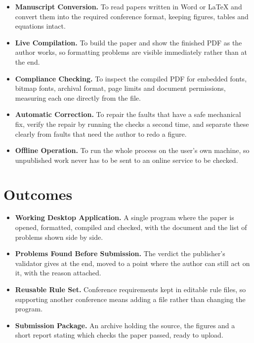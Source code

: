 \documentclass[11pt,a4paper]{article}
\newcommand{\heading}[1]{\textbf{#1}}
\begin{document}
\begin{itemize}
  \item \heading{Manuscript Conversion.} To read papers written in Word or
  \LaTeX{} and convert them into the required conference format, keeping
  figures, tables and equations intact.

  \item \heading{Live Compilation.} To build the paper and show the finished
  PDF as the author works, so formatting problems are visible immediately
  rather than at the end.

  \item \heading{Compliance Checking.} To inspect the compiled PDF for embedded
  fonts, bitmap fonts, archival format, page limits and document permissions,
  measuring each one directly from the file.

  \item \heading{Automatic Correction.} To repair the faults that have a safe
  mechanical fix, verify the repair by running the checks a second time, and
  separate these clearly from faults that need the author to redo a figure.

  \item \heading{Offline Operation.} To run the whole process on the user's own
  machine, so unpublished work never has to be sent to an online service to be
  checked.
\end{itemize}

\section{Outcomes}

\begin{itemize}
  \item \heading{Working Desktop Application.} A single program where the paper
  is opened, formatted, compiled and checked, with the document and the list of
  problems shown side by side.

  \item \heading{Problems Found Before Submission.} The verdict the publisher's
  validator gives at the end, moved to a point where the author can still act
  on it, with the reason attached.

  \item \heading{Reusable Rule Set.} Conference requirements kept in editable
  rule files, so supporting another conference means adding a file rather than
  changing the program.

  \item \heading{Submission Package.} An archive holding the source, the figures
  and a short report stating which checks the paper passed, ready to upload.
\end{itemize}
\end{document}
